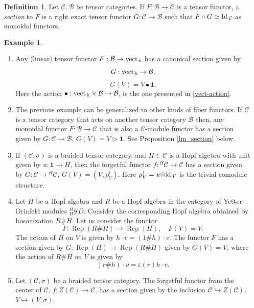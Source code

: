 \documentclass[11pt]{amsart}
\newcommand{\uc}{f}
\newcommand{\ot}{{\otimes}}
\newcommand{\vc}{{\mathcal C}}
\newcommand{\Bc}{{\mathcal B}}
\newcommand{\YD}{{\mathcal YD}}
\newcommand{\ku}{{\Bbbk}}
\newcommand{\uno}{ \mathbf{1}}
\newcommand{\id}{\mbox{\rm id\,}}
\newcommand{\Id}{\mbox{\rm Id\,}}
\newcommand{\vect}{\mbox{\rm vect\,}}
\newcommand\Rep{\operatorname{Rep}}
\renewcommand{\_}[1]{\mbox{$_{\left( #1 \right)}$}}
\theoremstyle{plain}
\numberwithin{equation}{section}
\theoremstyle{definition}
\newtheorem{defi}[teo]{Definition}
\newtheorem{exa}[teo]{Example}
\theoremstyle{remark}
\theoremstyle{introTheorems}
\begin{document}
\begin{defi}\label{def_section}  Let $\vc, \Bc$ be tensor categories. If $F:\Bc\to \vc$ is a tensor functor, a \textit{section} to $F$ is a right exact tensor functor $G:\vc\to \Bc$ such that $F\circ G\simeq \Id_\vc$ as monoidal functors. 
\end{defi} 
\begin{exa} \begin{enumerate}
\item Any (linear) tensor functor $F:\Bc \to \vect_\ku$ has a canonical section given by
$$G:\vect_\ku \to \Bc,$$
$$G(V)= V  \bullet \uno.$$
\medbreak
Here the action $\bullet:\vect_\ku\times \Bc\to \Bc$, is the one presented in  \eqref{vect-action}.



\item The previous example can be generalized to  other kinds of fiber functors. If $\vc$ is a tensor category that acts on another tensor category $\Bc$ then, any monoidal functor $F:\Bc\to \vc$ that is also a $\vc$-module functor has a section given by $G:\vc\to \Bc$, $G(V)=V\triangleright \uno$. See Proposition \ref{lm_section} below. 


\medbreak




\item If $(\vc,\sigma)$ is a braided tensor category, and $H\in \vc$ is a Hopf algebra with unit given by $u:\uno\to H$, then the forgetful functor $\uc: {}^H\vc\to \vc$ has a section given by $G:\vc\to {}^H\vc$, $G(V)=(V,\rho^t_V)$. Here  $\rho^t_V=u\ot \id_V$ is the trivial comodule structure.

\medbreak
\item Let $H$ be a Hopf algebra and $R$ be a  Hopf algebra in the category of Yetter-Drinfeld modules ${}^H_H\YD$. Consider the corresponding Hopf algebra obtained by bosonization $R\# H$. Let us consider the functor $$F:\Rep(R\# H)\to \Rep(H), \quad F(V)=V.$$ The action of $H$ on $V$ is given by $h\cdot v= (1\# h)\cdot v$. The functor $F$ has a section given by $G:\Rep(H)\to \Rep(R\# H)$ given by $G(V)=V$, where the action of $R\# H$ on $V$ is given by
$$(r\# h)\cdot v=\varepsilon(r) h\cdot v.$$

\item Let $(\vc,\sigma)$ be a braided tensor category. The forgetful functor from the center of $\vc$, $\uc :Z(\vc)\to \vc$,  has a section given by the inclusion $\vc \hookrightarrow Z(\vc)$, $V\mapsto (V,\sigma)$.

\end{enumerate}
\end{exa}
\end{document}
